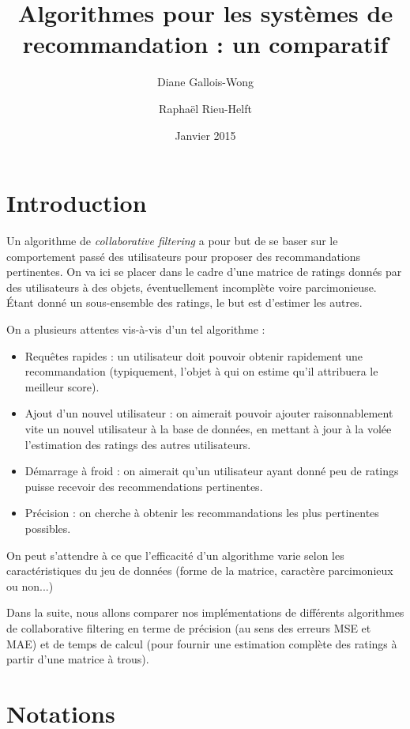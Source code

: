\documentclass[11pt, openany, a4paper]{article}
\begin{document}
\title{Algorithmes pour les systèmes de recommandation : un comparatif}
\author{Diane Gallois-Wong \and Raphaël Rieu-Helft}
\date{Janvier 2015}
\maketitle
\section*{Introduction}

Un algorithme de \emph{collaborative filtering} a pour but de se baser sur le comportement passé des utilisateurs pour proposer des recommandations pertinentes. On va ici se placer dans le cadre d'une matrice de ratings donnés par des utilisateurs à des objets, éventuellement incomplète voire parcimonieuse. Étant donné un sous-ensemble des ratings, le but est d'estimer les autres.

On a plusieurs attentes vis-à-vis d'un tel algorithme :
\begin{itemize}
	\item{Requêtes rapides : un utilisateur doit pouvoir obtenir rapidement une recommandation (typiquement, l'objet à qui on estime qu'il attribuera le meilleur score).}
	\item{Ajout d'un nouvel utilisateur : on aimerait pouvoir ajouter raisonnablement vite un nouvel utilisateur à la base de données, en mettant à jour à la volée l'estimation des ratings des autres utilisateurs.}
	\item{Démarrage à froid : on aimerait qu'un utilisateur ayant donné peu de ratings puisse recevoir des recommendations pertinentes.}
	\item{Précision : on cherche à obtenir les recommandations les plus pertinentes possibles.}
\end{itemize}

On peut s'attendre à ce que l'efficacité d'un algorithme varie selon les caractéristiques du jeu de données (forme de la matrice, caractère parcimonieux ou non...)

Dans la suite, nous allons comparer nos implémentations de différents algorithmes de collaborative filtering en terme de précision (au sens des erreurs MSE et MAE) et de temps de calcul (pour fournir une estimation complète des ratings à partir d'une matrice à trous).


\tableofcontents

\section*{Notations}
\end{document}
